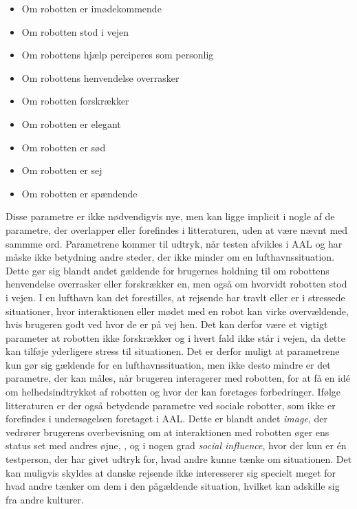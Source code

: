 %
\begin{multicols}{2}
	\begin{itemize}
		\item Om robotten er imødekommende
		\item Om robotten stod i vejen
		\item Om robottens hjælp perciperes som personlig
		\item Om robottens henvendelse overrasker
		\item Om robotten forskrækker
		\item Om robotten er elegant
		\item Om robotten er sød
		\item Om robotten er sej
		\item Om robotten er spændende
	\end{itemize}
\end{multicols}
\noindent
%
Disse parametre er ikke nødvendigvis nye, men kan ligge implicit i nogle af de parametre, der overlapper eller forefindes i litteraturen, uden at være nævnt med sammme ord. Parametrene kommer til udtryk, når testen afvikles i AAL og har måske ikke betydning andre steder, der ikke minder om en lufthavnssituation. Dette gør sig blandt andet gældende for brugernes holdning til om robottens henvendelse overrasker eller forskrækker en, men også om hvorvidt robotten stod i vejen. I en lufthavn kan det forestilles, at rejsende har travlt eller er i stressede situationer, hvor interaktionen eller mødet med en robot kan virke overvældende, hvis brugeren godt ved hvor de er på vej hen. Det kan derfor være et vigtigt parameter at robotten ikke forskrækker og i hvert fald ikke står i vejen, da dette kan tilføje yderligere stress til situationen. Det er derfor muligt at parametrene kun gør sig gældende for en lufthavnssituation, men ikke desto mindre er det parametre, der kan måles, når brugeren interagerer med robotten, for at få en idé om helhedsindtrykket af robotten og hvor der kan foretages forbedringer. \blankline
%
Ifølge litteraturen er der også betydende parametre ved sociale robotter, som ikke er forefindes i undersøgelsen foretaget i AAL. Dette er blandt andet \textit{image}, der vedrører brugerens overbevisning om at interaktionen med robotten øger ens status set med andres øjne, \parencite[s. 1478]{PDF:ExploringInfluencingVariable}, og i nogen grad \textit{social influence}, hvor der kun er én testperson, der har givet udtryk for, hvad andre kunne tænke om situationen. Det kan muligvis skyldes at danske rejsende ikke interesserer sig specielt meget for hvad andre tænker om dem i den pågældende situation, hvilket kan adskille sig fra andre kulturer. 

